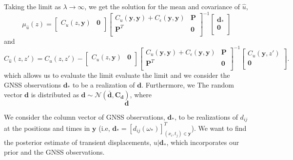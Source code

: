 \documentclass[10pt,a4paper]{article}
\begin{document}
Taking the limit as $\lambda \to \infty$, we get the solution for the mean and covariance of $\hat{u}$,
 \begin{equation}\label{eq:PosteriorMean3}
\mu_{\hat{u}}(z) =
\left[ 
\begin{array}{cc}
C_u(z,\bm{y}) & \bm{0} \\
\end{array}
\right]
\left[
\begin{array}{cc}
C_u(\bm{y},\bm{y}) + C_\epsilon(\bm{y},\bm{y}) & \bm{P} \\
\bm{P}^T  & \bm{0} \\
\end{array}
\right]^{-1}
\left[
\begin{array}{c}
\bm{d}_* \\
\bm{0} \\
\end{array}
\right]
\end{equation}    
and
\begin{equation}\label{eq:PosteriorCov3}
C_{\hat{u}}(z,z') = 
C_u(z,z') - 
\left[ 
\begin{array}{cc}
C_u(z,\bm{y}) & \bm{0} \\
\end{array}
\right]
\left[
\begin{array}{cc}
C_u(\bm{y},\bm{y}) + C_\epsilon(\bm{y},\bm{y}) & \bm{P} \\
\bm{P}^T  & \bm{0} \\
\end{array}
\right]^{-1}
\left[
\begin{array}{c}
C_u(\bm{y},z') \\
\bm{0} \\
\end{array}
\right].
\end{equation}
which allows us to evaluate the limit  evaluate the limit 
and we consider the GNSS observations $\bm{d}_*$ to be a realization of $\bm{d}$. Furthermore, we The random vector $\bm{d}$ is distributed as $\bm{d} \sim \mathcal{N}(\bar{\bm{d}},\bm{C_d})$, where 
\begin{equation}
\bm{d}
\end{equation}



We consider the column vector of GNSS observations, $\bm{d}_*$, to be realizations of $d_{ij}$ at the positions and times in $\bm{y}$ (i.e, $\bm{d}_* = [d_{ij}(\omega_*)]^T_{(x_i,t_j) \in \bm{y}}$). We want to find the posterior estimate of transient displacements, $u | \bm{d}_*$, which incorporates our prior and the GNSS observations.
\end{document}
